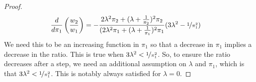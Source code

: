 \begin{proof}
\begin{align*}
    \frac{d}{d\pi_1} \left( \frac{w_2}{w_1} \right) &= 
    -\frac{2\lambda^2 \pi_2 + (\lambda + \frac{1}{\pi_2})^2 \pi_2 }{
    (2\lambda^2 \pi_1 + (\lambda + \frac{1}{\pi_1})^2 \pi_1 } (3\lambda^2 - \nicefrac{1}{\pi_1^2})
\end{align*}
We need this to be an increasing function in $\pi_1$ so that a decrease in $\pi_1$ implies a decrease in the ratio. This is true when  $3\lambda^2 < \nicefrac{1}{\pi_1^2}$. So, to ensure the ratio decreases after a step, we need an additional assumption on $\lambda$ and $\pi_1$, which is that $3\lambda^2 < \nicefrac{1}{\pi_1^2}$. This is notably always satisfied for $\lambda=0$. 

\end{proof}




